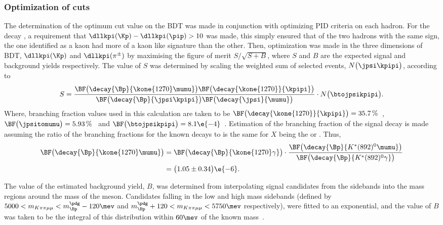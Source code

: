 \subsubsection[Optimization of \btokpipimumu cuts]
{Optimization of \tmath{\btokpipimumu} cuts}
\label{sssec:opt:kpipi}
The determination of the optimum cut value on the BDT was made in conjunction with optimizing PID
criteria on each hadron.
For the decay \btokpipimumu, a requirement that $\dllkpi(\Kp)-\dllkpi(\pip)>10$ was made, this
simply ensured that of the two hadrons with the same sign, the one identified as a kaon had more of
a kaon like signature than the other.
Then, optimization was made in the three dimensions of BDT, $\dllkpi(\Kp)$ and $\dllkpi(\pi^\pm)$
by maximising the figure of merit $S/\sqrt{S+B}$, where $S$ and $B$ are the expected signal and
background yields respectively.
The value of $S$ was determined by scaling the weighted sum of selected \btojpsikpipi events,
$N\big(\jpsi\kpipi\big)$, according to
\begin{equation}
  S =
  \frac{
    \BF\big(\decay{\Bp}{\kone{1270}\mumu}\big)
    \BF\big(\decay{\kone{1270}}{\kpipi}\big)
  }{
    \BF\big(\decay{\Bp}{\jpsi\kpipi}\big)
    \BF\big(\decay{\jpsi}{\mumu}\big)
  }
  \cdot
  N\big(\btojpsikpipi\big).
\end{equation}
Where, branching fraction values used in this calculation are taken to be
$\BF\big(\decay{\kone{1270}}{\kpipi}\big) = 35.7\,\%$~\cite{PDG2012},
$\BF\big(\jpsitomumu\big) = 5.93\,\%$~\cite{PDG2012} and
$\BF\big(\btojpsikpipi\big) = 8.1\e{-4}$~\cite{PDG2012}.
Estimation of the branching fraction of the signal decay  is made
assuming the ratio of the branching fractions for the known decays  to
is the same for $X$ being the  or \Kstarent.
Thus,
\begin{align}
  \BF\big(\decay{\Bp}{\kone{1270}\mumu}\big)
  &=
  \BF\big(\decay{\Bp}{\kone{1270}\gamma}\big)
  \cdot\frac{
    \BF\big(\decay{\Bp}{K^*(892)^0\mumu}\big)
  }{
  \BF\big(\decay{\Bp}{K^*(892)^0\gamma}\big)
  }\nonumber\\
  &=\big(1.05\pm0.34\big)\e{-6}.
\end{align}


The value of the estimated background yield, $B$, was determined from interpolating signal
\btokpipimumu candidates from the sidebands into the mass regions around the mass of the \Bp meson.
Candidates falling in the low and high mass sidebands
(defined by $5000<m_{K\pi\pi\mu\mu}<m_{\Bp}^\pdg-120\mev$ and
$m_{\Bp}^\pdg+120<m_{K\pi\pi\mu\mu}<5750\mev$ respectively),
were fitted to an exponential, and the value of $B$ was taken to be the integral of this
distribution within $60\mev$ of the known \Bp mass~\cite{PDG2012}.

